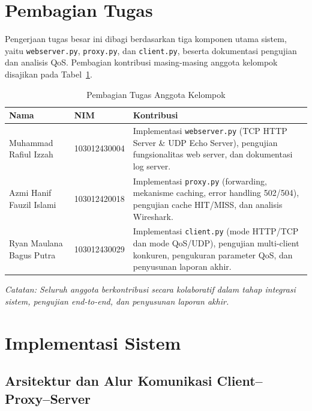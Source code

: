 \documentclass[11pt,a4paper]{article}
\begin{document}
\section{Pembagian Tugas}

Pengerjaan tugas besar ini dibagi berdasarkan tiga komponen utama sistem, yaitu \texttt{webserver.py}, \texttt{proxy.py}, dan \texttt{client.py}, beserta dokumentasi pengujian dan analisis QoS. Pembagian kontribusi masing-masing anggota kelompok disajikan pada Tabel~\ref{tab:pembagian-tugas}.

\begin{table}[H]
\centering
\caption{Pembagian Tugas Anggota Kelompok}
\label{tab:pembagian-tugas}
\renewcommand{\arraystretch}{1.2}
\begin{tabular}{l l p{8.5cm}}
\toprule
\rowcolor{tableheader}
\textbf{Nama} & \textbf{NIM} & \textbf{Kontribusi} \\
\midrule
Muhammad Rafiul Izzah & 103012430004 &
Implementasi \texttt{webserver.py} (TCP HTTP Server \& UDP Echo Server), pengujian fungsionalitas web server, dan dokumentasi log server. \\
Azmi Hanif Fauzil Islami & 103012420018 &
Implementasi \texttt{proxy.py} (forwarding, mekanisme caching, error handling 502/504), pengujian cache HIT/MISS, dan analisis Wireshark. \\
Ryan Maulana Bagus Putra & 103012430029 &
Implementasi \texttt{client.py} (mode HTTP/TCP dan mode QoS/UDP), pengujian multi-client konkuren, pengukuran parameter QoS, dan penyusunan laporan akhir. \\
\bottomrule
\end{tabular}
\end{table}

\noindent\textit{Catatan: Seluruh anggota berkontribusi secara kolaboratif dalam tahap integrasi sistem, pengujian end-to-end, dan penyusunan laporan akhir.}


\section{Implementasi Sistem}

\subsection{Arsitektur dan Alur Komunikasi Client--Proxy--Server}
\end{document}
